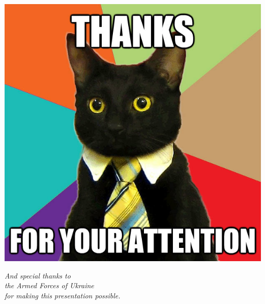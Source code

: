 \documentclass[12pt,pdf,aspectratio=169,t]{beamer}
\begin{document}
    \begin{frame}
        \begin{minipage}{0.5\textwidth}
            \includegraphics[width=\linewidth]{plots/cat.png}
        \end{minipage}
        \begin{minipage}{0.4\textwidth}\raggedleft
            \emph{And special thanks to \\ the Armed Forces of Ukraine \\
            for making this presentation possible.}
        \end{minipage}
    \end{frame}
\end{document}
